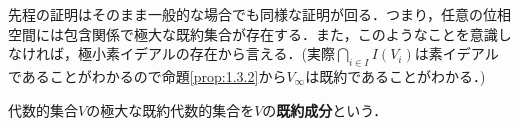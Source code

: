 \documentclass{myclass}
\begin{document}
\begin{remark}
  先程の証明はそのまま一般的な場合でも同様な証明が回る．つまり，任意の位相空間には包含関係で極大な既約集合が存在する．また，このようなことを意識しなければ，極小素イデアルの存在から言える．(実際$\bigcap_{i\in I}I(V_i)$は素イデアルであることがわかるので命題\ref{prop:1.3.2}から$V_{\infty}$は既約であることがわかる．)
\end{remark}

\begin{definition}
  代数的集合$V$の極大な既約代数的集合を$V$の\textbf{既約成分}という．
\end{definition}


\backmatter

\printindex



\end{document}
